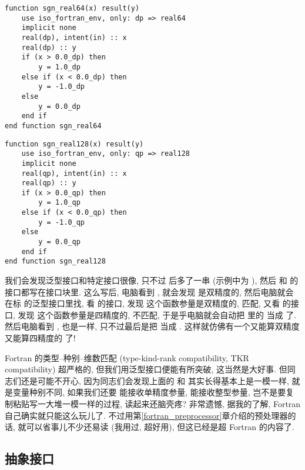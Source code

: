 \begin{lstlisting}
function sgn_real64(x) result(y)
    use iso_fortran_env, only: dp => real64
    implicit none
    real(dp), intent(in) :: x
    real(dp) :: y
    if (x > 0.0_dp) then
        y = 1.0_dp
    else if (x < 0.0_dp) then
        y = -1.0_dp
    else
        y = 0.0_dp
    end if
end function sgn_real64
\end{lstlisting}
\begin{lstlisting}
function sgn_real128(x) result(y)
    use iso_fortran_env, only: qp => real128
    implicit none
    real(qp), intent(in) :: x
    real(qp) :: y
    if (x > 0.0_qp) then
        y = 1.0_qp
    else if (x < 0.0_qp) then
        y = -1.0_qp
    else
        y = 0.0_qp
    end if
end function sgn_real128
\end{lstlisting} 
我们会发现泛型接口和特定接口很像, 只不过  后多了一串 (示例中为 ), 然后  和  的接口都写在接口块里. 这么写后, 电脑看到 , 就会发现  是双精度的, 然后电脑就会在标  的泛型接口里找, 看  的接口, 发现  这个函数参量是双精度的, 匹配, 又看  的接口, 发现  这个函数参量是四精度的, 不匹配, 于是乎电脑就会自动把  里的  当成  了. 然后电脑看到 , 也是一样, 只不过最后是把  当成 . 这样就仿佛有一个又能算双精度又能算四精度的  了!

Fortran 的类型--种别--维数匹配 (type-kind-rank compatibility, TKR compatibility) 超严格的, 但我们用泛型接口便能有所突破, 这当然是大好事. 但同志们还是可能不开心, 因为同志们会发现上面的  和  其实长得基本上是一模一样, 就是变量种别不同, 如果我们还要  能接收单精度参量, 能接收整型参量, 岂不是要复制粘贴写一大堆一模一样的过程, 读起来还脑壳疼? 非常遗憾, 据我的了解, Fortran 自己确实就只能这么玩儿了. 不过用第\ref{fortran_preprocessor}章介绍的预处理器的话, 就可以省事儿不少还易读 (我用过, 超好用), 但这已经是超 Fortran 的内容了. 

\subsection{抽象接口} 

